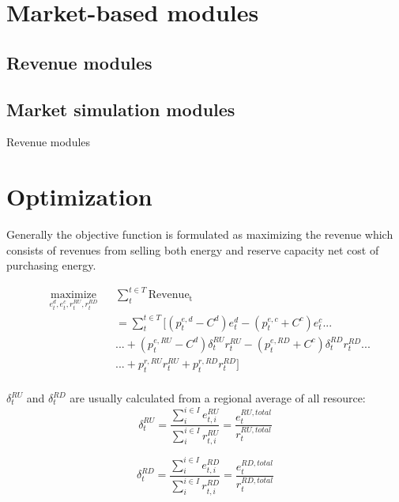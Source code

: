 \section{Market-based modules}
\subsection{Revenue modules}

\subsection{Market simulation modules}
\begin{algorithm}
	\caption{Revenue modules}\label{RevenueModule}
\end{algorithm}




\section{Optimization}
Generally the objective function is formulated as maximizing the revenue which consists of revenues from selling both energy and reserve capacity net cost of purchasing energy.

\begin{equation}
\label{eq:obj-general}
\begin{aligned}
& \underset{e_t^d, e_t^c, r^{RU}_t, r^{RD}_t}{\text{maximize}}
& & \sum_t^{t \in T} \mathrm{Revenue_t} \\
& & &= \sum_t^{t \in T} [(p_t^{e, d}-C^d) e_t^d - (p_t^{e, c}+C^c) e_t^c ...\\
& & & ... + (p_t^{e, RU}-C^d) \delta_t^{RU} r_t^{RU} - (p_t^{e, RD}+C^c) \delta^{RD}_t r^{RD}_t ... \\
& & & ...  + p_t^{r, RU} r^{RU}_t + p_t^{r,RD} r^{RD}_t]\\
\end{aligned}
\end{equation}

$\delta^{RU}_t$ and $\delta^{RD}_t$ are usually calculated from a regional average of all resource:
\begin{equation*}
	\delta^{RU}_t = \frac{\sum_{i}^{i \in I} e_{t,i}^{RU}}{\sum_{i}^{i \in I} r_{t,i}^{RU}} = \frac{e_t^{RU, total}}{r_t^{RU, total}}
\end{equation*}

\begin{equation*}
\delta^{RD}_t = \frac{\sum_{i}^{i \in I} e_{t,i}^{RD}}{\sum_{i}^{i \in I} r_{t,i}^{RD}} = \frac{e_t^{RD, total}}{r_t^{RD, total}}
\end{equation*}

